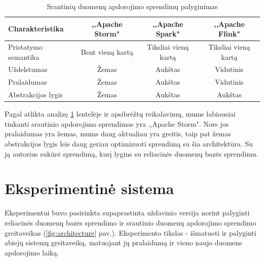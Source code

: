 \documentclass{VUMIFPSkursinis}
\begin{document}
\begin{table}[!htbp]
    \begin{center}
        \caption{Srautinių duomenų apdorojimo sprendimų palyginimas}
        \label{table:comparer}
        \begin{tabular}{ | l | c | c | c | } 
            \hline
            Charakteristika & ,,Apache Storm" & ,,Apache Spark" & ,,Apache Flink" \\* \hline
            Pristatymo semantika & Bent vieną kartą & Tiksliai vieną kartą & Tiksliai vieną kartą \\* \hline
            Uždelstumas & Žemas & Aukštas & Vidutinis \\* \hline
            Pralaidumas & Žemas & Aukštas & Vidutinis \\* \hline
            Abstrakcijos lygis & Žemas & Aukštas & Aukštas \\* \hline
        \end{tabular}
    \end{center}
\end{table}\par

Pagal atlikta analizę \ref{table:comparer} lentelėje ir apsibrėžtų reikalavimų, mums labiausiai tinkanti srautinio apdorojimo sprendimas yra ,,Apache Storm". 
Nors jos pralaidumas yra žemas, mums daug aktualiau yra greitis, taip pat žemas abstrakcijos lygis leis daug geriau optimizuoti sprendimą su šia architektūra. Su ją autorius
sukūrė sprendimą, kurį lygins su reliacinės duomenų bazės sprendimu.

\section{Eksperimentinė sistema}

Eksperimentui buvo pasirinkta supaprastinta uždavinio versija norint palyginti reliacinės duomenų bazės sprendimo ir srautinio duomenų 
apdorojimo sprendimo greitaveikas (\ref{fig:architecture} pav.).
Eksperimento tikslas - išmatuoti ir palyginti abiejų sistemų greitaveiką, matuojant jų pralaidumą ir vieno naujo duomens apdorojimo laiką.
\end{document}

